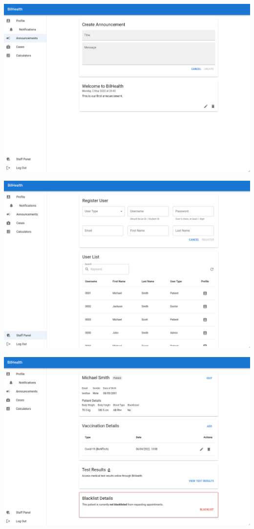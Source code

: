 \documentclass[a4paper, 12pt, titlepage]{article}
\begin{document}
  \includegraphics[width=\linewidth]{uim_announce.png}

  \includegraphics[width=\linewidth]{uim_staff.png}

  \includegraphics[width=\linewidth]{uim_profile.png}
\end{document}
